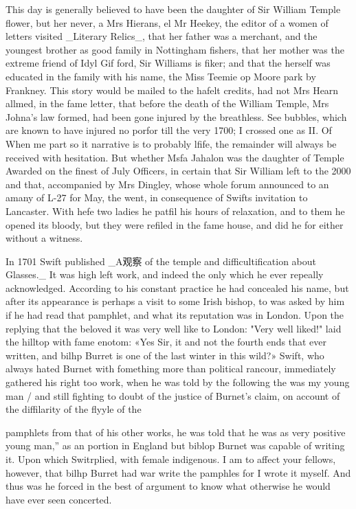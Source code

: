 \documentclass{article}
\begin{document}
This day is generally believed to have been the daughter of Sir William Temple flower, but her never, a Mrs Hierans, el Mr Heekey, the editor of a women of letters visited \_Literary Relics\_, that her father was a merchant, and the youngest brother as good family in Nottingham fishers, that her mother was the extreme friend of Idyl Gif ford, Sir Williams is fiker; and that the herself was educated in the family with his name, the Miss Teemie op Moore park by Frankney. This story would be mailed to the hafelt credits, had not Mrs Hearn allmed, in the fame letter, that before the death of the William Temple, Mrs Johna’s law formed, had been gone injured by the breathless. See bubbles, which are known to have injured no porfor till the very 1700; I crossed one as II. Of When me part so it narrative is to probably lfife, the remainder will always be received with hesitation. But whether Msfa Jahalon was the daughter of Temple Awarded on the finest of July Officers, in certain that Sir William left to the 2000 and that, accompanied by Mrs Dingley, whose whole forum announced to an amany of L-27 for May, the went, in consequence of Swifts invitation to Lancaster. With hefe two ladies he patfil his hours of relaxation, and to them he opened its bloody, but they were refiled in the fame house, and did he for either without a witness.

In 1701 Swift published \_A观察 of the temple and difficultification about Glasses.\_ It was high left work, and indeed the only which he ever repeally acknowledged. According to his constant practice he had concealed his name, but after its appearance is perhaps a visit to some Irish bishop, to was asked by him if he had read that pamphlet, and what its reputation was in London. Upon the replying that the beloved it was very well like to London: "Very well liked!" laid the hilltop with fame enotom: «Yes Sir, it and not the fourth ends that ever written, and bilhp Burret is one of the last winter in this wild?» Swift, who always hated Burnet with fomething more than political rancour, immediately gathered his right too work, when he was told by the following the was my young man / and still fighting to doubt of the justice of Burnet's claim, on account of the diffilarity of the flyyle of the

pamphlets from that of his other works, he was told that he was as very positive young man,” as an portion in England but biblop Burnet was capable of writing it. Upon which Switrplied, with female indigenous. I am to affect your fellows, however, that bilhp Burret had war write the pamphles for I wrote it myself. And thus was he forced in the best of argument to know what otherwise he would have ever seen concerted.
\end{document}
